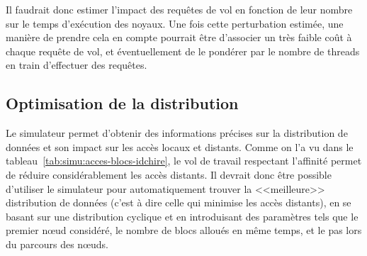 Il faudrait donc estimer l'impact des requêtes de vol en fonction de leur nombre sur le temps d'exécution des noyaux.
Une fois cette perturbation estimée, une manière de prendre cela en compte pourrait être d'associer un très faible coût à chaque requête de vol, et éventuellement de le pondérer par le nombre de threads en train d'effectuer des requêtes.

\subsection{Optimisation de la distribution}

Le simulateur permet d'obtenir des informations précises sur la distribution de données et son impact sur les accès locaux et distants.
Comme on l'a vu dans le tableau~\ref{tab:simu:acces-blocs-idchire}, le vol de travail respectant l'affinité permet de réduire considérablement les accès distants.
Il devrait donc être possible d'utiliser le simulateur pour automatiquement trouver la <<meilleure>> distribution de données (c'est à dire celle qui minimise les accès distants), en se basant sur une distribution cyclique et en introduisant des paramètres tels que le premier nœud considéré, le nombre de blocs alloués en même temps, et le pas lors du parcours des nœuds.
